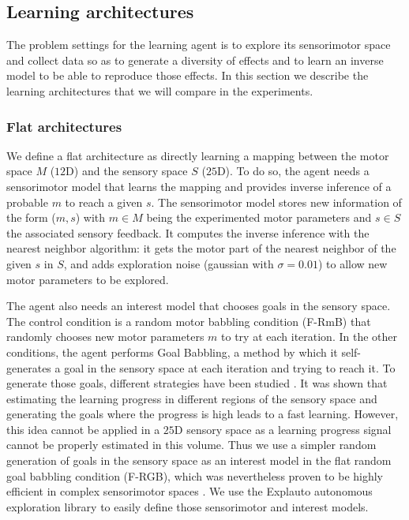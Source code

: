 \documentclass[10pt,letterpaper]{article}
\begin{document}
		
	
	\subsection{Learning architectures}

		The problem settings for the learning agent is to explore its sensorimotor space and collect data so as to generate a diversity of effects and to learn an inverse model to 
		be able to reproduce those effects.
		In this section we describe the learning architectures that we will compare in the experiments.
		
		\subsubsection{Flat architectures}
			
			We define a flat architecture as directly learning a mapping between the motor space $M$ ($12$D) and the sensory space $S$ ($25$D).
			To do so, the agent needs a sensorimotor model that learns the mapping and provides inverse inference of a probable $m$ to reach a given $s$.
			The sensorimotor model stores new information of the form ($m, s$) with $m \in M$ being the experimented motor parameters and $s \in S$ the associated sensory feedback. 
			It computes the inverse inference with the nearest neighbor algorithm: 
			it gets the motor part of the nearest neighbor of the given $s$ in $S$, and adds exploration noise (gaussian with $\sigma=0.01$) to allow new motor parameters to be explored.
			
			The agent also needs an interest model that chooses goals in the sensory space.
			The control condition is a random motor babbling condition (F-RmB) that randomly chooses new motor parameters $m$ to try at each iteration.
			In the other conditions, the agent performs Goal Babbling, a method by which it self-generates a goal in the sensory space at each iteration and trying to reach it.
			To generate those goals, different strategies have been studied \cite{baranes_active_2013}. 
			It was shown that estimating the learning progress in different regions of the sensory space and generating the goals where the progress is high leads to a fast learning.
			However, this idea cannot be applied in a $25$D sensory space as a learning progress signal cannot be properly estimated in this volume.
			Thus we use a simpler random generation of goals in the sensory space as an interest model in the flat random goal babbling condition (F-RGB), 
			which was nevertheless proven to be highly efficient in complex sensorimotor spaces \cite{rolf}.
			We use the Explauto autonomous exploration library \cite{moulin-frier_explauto:_2014} to easily define those sensorimotor and interest models.
			
\end{document}
